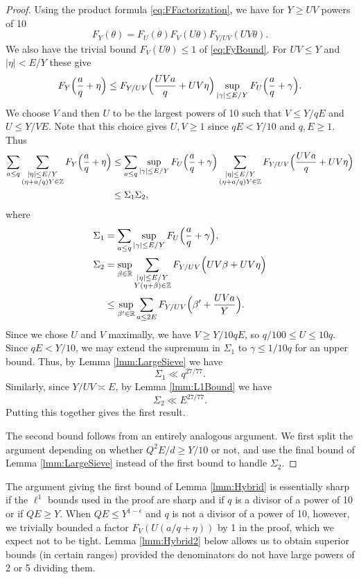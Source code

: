 \documentclass[10pt]{amsart}
\theoremstyle{plain}
\numberwithin{sblmm}{thrm}
\numberwithin{equation}{section}
\begin{document}
\begin{proof}
Using the product formula \eqref{eq:FFactorization}, we have for $Y\ge UV$ powers of 10
\[
F_{Y}(\theta)=F_{U}(\theta)F_{V}(U \theta)F_{Y/UV}(UV\theta).
\]
We also have the trivial bound $F_{V}(U\theta)\le 1$ of \eqref{eq:FyBound}. For $UV\le Y$ and $|\eta|<E/Y$ these give
\[
F_{Y}\Bigl(\frac{a}{q}+\eta\Bigr)\le F_{Y/UV}\Bigl(\frac{U V a}{q}+UV\eta\Bigr)\sup_{|\gamma|\le E/Y}F_{U}\Bigl(\frac{a}{q}+\gamma\Bigr).
\]
We choose $V$ and then $U$ to be the largest powers of 10 such that $V\le Y/q E$ and $U\le Y/V E$. Note that this choice gives $U,V\ge 1$ since $q E<Y/10$ and $q,E\ge 1$. Thus
\begin{align*}
\sum_{a\le q}\sum_{\substack{|\eta|\le E/Y\\ (\eta+a/q)Y\in\mathbb{Z}}}F_Y\Bigl(\frac{a}{q}+\eta\Bigr)& \le \sum_{a\le q}\sup_{|\gamma|\le E/Y}F_{U}\Bigl(\frac{a}{q}+\gamma\Bigr)\sum_{\substack{|\eta|\le E/Y\\ (\eta+a/q)Y\in\mathbb{Z}}}F_{Y/UV}\Bigl(\frac{U V a}{q}+UV\eta\Bigr)\\
&\le \Sigma_1\Sigma_2,
\end{align*}
where
%
\begin{align*}
\Sigma_1&=\sum_{a\le q}\sup_{|\gamma|\le E/Y}F_{U}\Bigl(\frac{a}{q}+\gamma\Bigr),\\
\Sigma_2&=\sup_{\beta\in\mathbb{R}}\sum_{\substack{|\eta|\le E/Y\\ Y(\eta+\beta)\in\mathbb{Z}}}F_{Y/UV}\Bigl(U V\beta+UV\eta\Bigr)\\
&\le \sup_{\beta'\in\mathbb{R}}\sum_{a\le 2E}F_{Y/UV}\Bigl(\beta'+\frac{U V a}{Y}\Bigr).
\end{align*}
%
Since we chose $U$ and $V$ maximally, we have $V\ge Y/10q E$, so $q/100\le U\le 10q$. Since $q E<Y/10$, we may extend the supremum in $\Sigma_1$ to $\gamma\le 1/10q$ for an upper bound. Thus, by Lemma \ref{lmm:LargeSieve} we have
\[
\Sigma_1\ll q^{27/77}.
\]
Similarly, since $Y/UV\asymp E$, by Lemma \ref{lmm:L1Bound} we have
\[
\Sigma_2\ll E^{27/77}.
\]
Putting this together gives the first result.

The second bound follows from an entirely analogous argument. We first split the argument depending on whether $Q^2E/d\ge Y/10$ or not, and use the final bound of Lemma \ref{lmm:LargeSieve} instead of the first bound to handle $\Sigma_2$.
%
\end{proof}
%
%
%
%
%
The argument giving the first bound of Lemma \ref{lmm:Hybrid} is essentially sharp if the $\ell^1$ bounds used in the proof are sharp and if $q$ is a divisor of a power of 10 or if $Q E\ge Y$. When $Q E\le Y^{1-\epsilon}$ and $q$ is not a divisor of a power of 10, however, we trivially bounded a factor $F_V(U(a/q+\eta))$ by 1 in the proof, which we expect not to be tight. Lemma \ref{lmm:Hybrid2} below allows us to obtain superior bounds (in certain ranges) provided the denominators do not have large powers of 2 or 5 dividing them.
\end{document}
